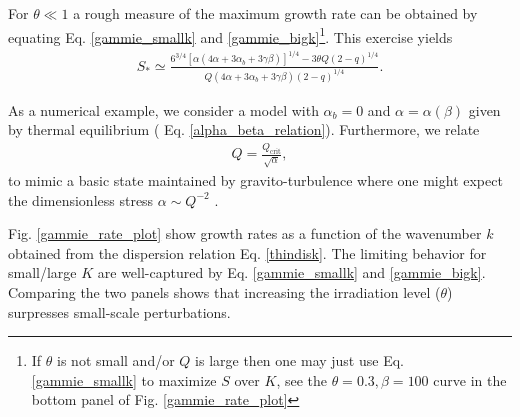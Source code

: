 For $\theta\ll1$ a rough measure of the maximum growth rate can be obtained by
equating Eq. \ref{gammie_smallk} and \ref{gammie_bigk}\footnote{If
  $\theta$ is not small and/or $Q$  is large then one may just use Eq. \ref{gammie_smallk}
  to maximize $S$ over $K$, see the $\theta=0.3,\beta=100$ curve in the bottom
  panel of Fig. \ref{gammie_rate_plot}}.  
This exercise yields 
\begin{align}\label{gammie_maxrate_simple}
  S_*\simeq \frac{
    6^{3/4}\left[\alpha\left(4\alpha +
      3\alpha_b + 3\gamma\beta\right)\right]^{1/4} - 3\theta
    Q(2-q)^{1/4}}{Q\left(4\alpha + 3\alpha_b +
    3\gamma\beta\right)(2-q)^{1/4}}. 
\end{align} 

As a numerical example, we consider a model with $\alpha_b=0$ and
$\alpha=\alpha(\beta)$ given by thermal equilibrium (
Eq. \ref{alpha_beta_relation}). Furthermore, we relate 
\begin{align}
  Q = \frac{Q_\mathrm{crit}}{\sqrt{\alpha}},\label{Qalpha}
\end{align}
to mimic a basic state maintained by gravito-turbulence where one
might expect the dimensionless stress $\alpha \sim Q^{-2}$
\citep{lin87}.   

Fig. \ref{gammie_rate_plot} show growth rates as a function of the
wavenumber $k$ obtained from the dispersion relation
Eq. \ref{thindisk}. The limiting behavior for small/large $K$ are
well-captured by Eq. \ref{gammie_smallk} and
\ref{gammie_bigk}. Comparing the two panels shows that increasing the
irradiation level ($\theta$) surpresses small-scale perturbations.     


